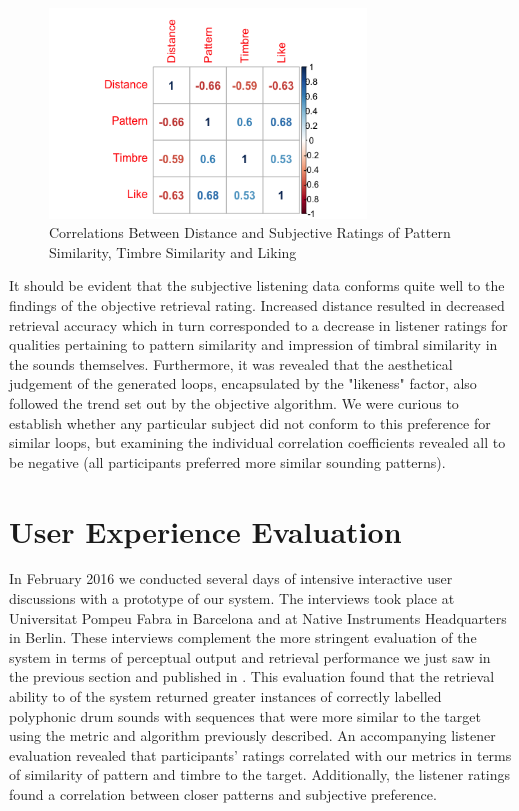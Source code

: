 \begin{figure}
	\begin{center}
		\includegraphics[width=0.75\textwidth]{ch07_evaluation/figures/correlation_matrix.png}
	\end{center}
	\caption[Correlations Between Distance and Subjective Ratings of Pattern Similarity, Timbre Similarity and Liking]{Correlations Between Distance and Subjective Ratings of Pattern Similarity, Timbre Similarity and Liking}
	\label{fig:correlation_matrix}
\end{figure}

It should be evident that the subjective listening data conforms quite well to the findings of the objective retrieval rating. Increased distance resulted in decreased retrieval accuracy which in turn corresponded to a decrease in listener ratings for qualities pertaining to pattern similarity and impression of timbral similarity in the sounds themselves. Furthermore, it was revealed that the aesthetical judgement of the generated loops, encapsulated by the "likeness" factor, also followed the trend set out by the objective algorithm. We were curious to establish whether any particular subject did not conform to this preference for similar loops, but examining the individual correlation coefficients revealed all to be negative (all participants preferred more similar sounding patterns).

\section{User Experience Evaluation}

In February 2016 we conducted several days of intensive interactive user discussions with a prototype of our system. The interviews took place at Universitat Pompeu Fabra in Barcelona and at Native Instruments Headquarters in Berlin. These interviews complement the more stringent evaluation of the system in terms of perceptual output and retrieval performance  we just saw in the previous section and published in \citep{Nuanain2016b}. This evaluation found that the retrieval ability to of the system returned greater instances of correctly labelled polyphonic drum sounds with sequences that were more similar to the target using the metric and algorithm previously described. An accompanying listener evaluation revealed that participants’ ratings correlated with our metrics in terms of similarity of pattern and timbre to the target. Additionally, the listener ratings found a correlation between closer patterns and subjective preference.

